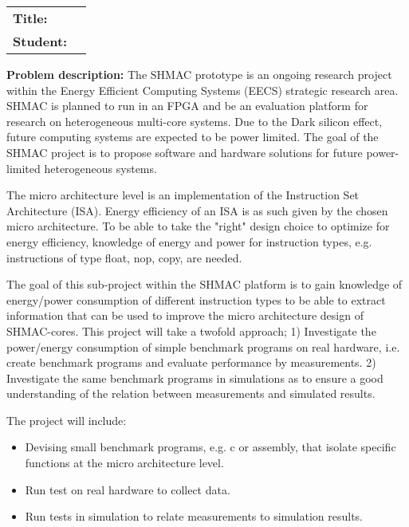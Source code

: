 \begin{titlingpage}

\noindent
\begin{tabular}{@{}p{4cm}l}
\textbf{Title:} 	& \thetitle \\
\textbf{Student:}	& \theauthor \\
\end{tabular}

\vspace{4ex}
\noindent\textbf{Problem description:}
\vspace{2ex}
The SHMAC prototype is an ongoing research project within the Energy
 Efficient Computing Systems (EECS) strategic research area. SHMAC is planned
 to run in an FPGA and be an evaluation platform for research on
 heterogeneous multi-core systems. Due to the Dark silicon effect, future
 computing systems are expected to be power limited. The goal of the SHMAC
 project is to propose software and hardware solutions for future
 power-limited heterogeneous systems.

The micro architecture level is an implementation of the Instruction Set
 Architecture (ISA). Energy efficiency of an ISA is as such given by the
 chosen micro architecture. To be able to take the "right" design choice to
 optimize for energy efficiency, knowledge of energy and power for
 instruction types, e.g. instructions of type float, nop, copy, are needed.

The goal of this sub-project within the SHMAC platform is to gain knowledge
 of energy/power consumption of different instruction types to be able to
 extract information that can be used to improve the micro architecture
 design of SHMAC-cores. This project will take a twofold approach; 1)
 Investigate the power/energy consumption of simple benchmark programs on
 real hardware, i.e. create benchmark programs and evaluate performance by
 measurements. 2) Investigate the same benchmark programs in simulations as
 to ensure a good understanding of the relation between measurements and
 simulated results.

\noindent The project will include:
\begin{itemize}
    \item Devising small benchmark programs, e.g. c or assembly, that isolate specific functions at the micro architecture level.
    \item Run test on real hardware to collect data.
    \item Run tests in simulation to relate measurements to simulation results.
\end{itemize}


\end{titlingpage}
